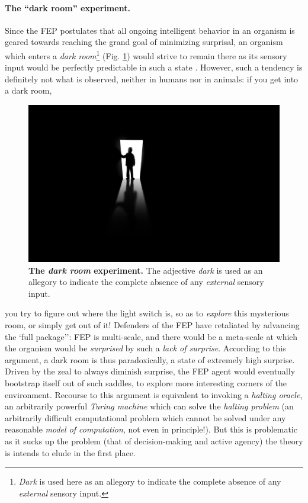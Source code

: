\documentclass[10pt,letterpaper]{article}
\begin{document}
\paragraph{The ``dark room'' experiment.}
Since the FEP postulates that all ongoing intelligent behavior in an organism is geared towards reaching the grand goal of minimizing surprisal, an organism which enters a \textit{dark room}\footnote{\textit{Dark} is used here as an allegory to indicate the complete absence of any \textit{external} sensory input.} (Fig. \ref{fig:darkroom}) would strive to remain there as its sensory input would be perfectly predictable in such a state \citep{darkroom2012}.
However, such a tendency is definitely not what is observed, neither in humans nor in animals: if you get into a dark room,
\begin{figure}
  \centering
  \includegraphics[width=1.\linewidth]{darkroom.jpg}
  \caption{\textbf{The \textit{dark room} experiment.} The adjective \textit{dark} is used as an allegory to indicate the complete absence of any \textit{external} sensory input.}  
  \label{fig:darkroom}
\end{figure}
you try to figure out where the light switch is, so as to \textit{explore} this mysterious room, or simply get out of it! Defenders of the FEP have retaliated by advancing the `full package''\citep{darkroom2012}: FEP is multi-scale, and there would be a meta-scale at which the organism would
be \textit{surprised} by such a \textit{lack of surprise}. According to this argument, a dark room is thus paradoxically, a state of extremely high surprise. Driven by the zeal to always diminish surprise, the FEP agent would eventually bootstrap itself out of such saddles, to explore more interesting corners of the environment. Recourse to this argument is equivalent to invoking a \textit{halting oracle}\citep{haltingoracle}, an arbitrarily powerful \textit{Turing machine} which can solve the \textit{halting problem} (an arbitrarily difficult computational problem which cannot be solved under any reasonable \textit{model of computation}, not even in principle!). But this is problematic as it sucks up the problem (that of decision-making and active agency) the theory is intends to elude in the first place.
\end{document}
